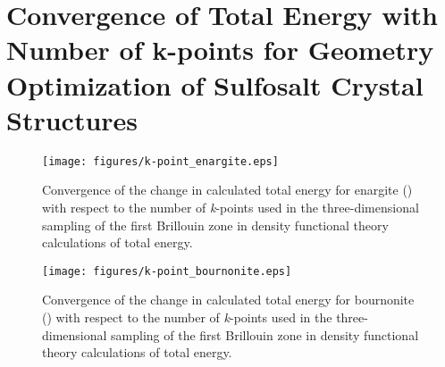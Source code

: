 \chapter{Convergence of Total Energy with Number of k-points for Geometry Optimization of Sulfosalt Crystal Structures}\label{k-points}

\begin{figure}[h!]
  \centering
    \texttt{[image: figures/k-point\_enargite.eps]}
    \caption{Convergence of the change in calculated total energy for enargite ({\enargite}) with respect to the number of \textit{k}-points used in the three-dimensional sampling of the first Brillouin zone in density functional theory calculations of total energy.}
  \label{k-point_enargite}
\end{figure}

\begin{figure}[h!]
  \centering
    \texttt{[image: figures/k-point\_bournonite.eps]}
    \caption{Convergence of the change in calculated total energy for bournonite ({\bournonite}) with respect to the number of \textit{k}-points used in the three-dimensional sampling of the first Brillouin zone in density functional theory calculations of total energy.}
  \label{k-point_bournonite}
\end{figure}


